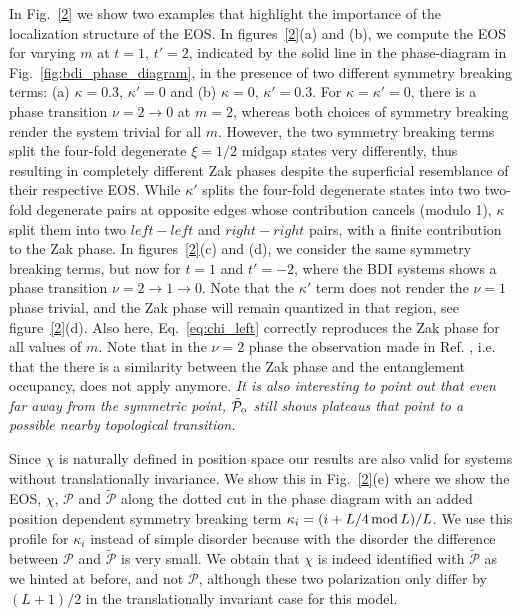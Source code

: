 \documentclass[twocolumn,amsmath,longbibliography,amssymb,superscriptaddress]{revtex4-1}
\newcommand{\mariac}[1]{{\it\color{cyan}#1}}
\newcommand{\tpo}{\tilde{\mathcal{P}}_{\rm o}}
\begin{document}
In Fig.~\ref{2} we show two examples that highlight the importance of the localization structure of the EOS. 
In figures~\ref{2}(a) and (b), we compute the EOS for varying $m$ at  $t=1$, $t'=2$, indicated by the solid line  in the phase-diagram in Fig.~\ref{fig:bdi_phase_diagram}, in the presence of two different symmetry breaking terms: (a) $\kappa =0.3$, $\kappa'=0$ and (b) $\kappa=0$, $\kappa'=0.3$.  
For $\kappa=\kappa'=0$, there is a phase transition $\nu = 2 \rightarrow 0 $ at $m=2$, whereas both choices of symmetry breaking render the system trivial  for all $m$.
However, the two symmetry breaking terms split the four-fold degenerate $\xi=1/2$ midgap states very differently, thus resulting in completely different Zak phases despite the superficial resemblance of their respective EOS.  
While $\kappa'$ splits the four-fold degenerate states into two two-fold degenerate pairs at opposite edges whose contribution cancels (modulo 1), $\kappa$ split them into two $left-left$ and $right-right$ pairs, with a finite contribution to the Zak phase. 
In figures~\ref{2}(c) and (d), we consider the same symmetry breaking terms, but now for $t=1$ and $t'=-2$, where the BDI systems shows a phase transition  $\nu=2\rightarrow 1\rightarrow 0$. 
Note that the $\kappa'$ term does not render the $\nu=1$ phase trivial, and the Zak phase will remain quantized in that region, see figure~\ref{2}(d). 
Also here, Eq.~\eqref{eq:chi_left} correctly reproduces the Zak phase for all values of $m$. 
Note that in the $\nu=2$ phase the observation made in Ref. \cite{Huang2012}, i.e. that the there is a similarity between the Zak phase and the entanglement occupancy, does not apply anymore. 
\mariac{It is also interesting to point out that even far away from the symmetric point, $\tpo$ still shows plateaus that point to a possible nearby topological transition.}

Since $\chi$ is naturally defined in position space our results are also valid for systems without translationally invariance. We show this in Fig.~\ref{2}(e) where we show the EOS, $\chi$, $\mathcal{P}$ and $\tilde{\mathcal{P}}$ along the dotted cut in the phase diagram with an added position dependent symmetry breaking term $\kappa_i = (i+L/4 \, {\rm mod}\, L)/L$. We use this profile for $\kappa_i$ instead of simple disorder because with the disorder the difference between $\mathcal{P}$ and $\tilde{\mathcal{P}}$ is very small. We obtain that $\chi$ is indeed identified with $\tilde{\mathcal{P}}$ as we hinted at before, and not $\mathcal{P}$, although these two polarization only differ by $(L+1)/2$ in the translationally invariant case for this model. 
\end{document}
